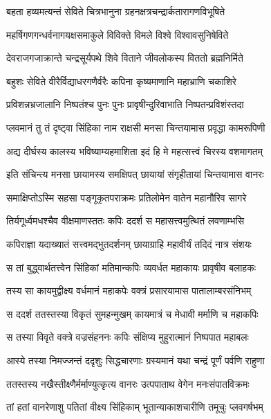 \twolineshloka
{बहता हव्यमत्यन्तं सेविते चित्रभानुना}
{ग्रहनक्षत्रचन्द्रार्कतारागणविभूषिते} %

\twolineshloka
{महर्षिगणगन्धर्वनागयक्षसमाकुले}
{विविक्ते विमले विश्वे विश्वावसुनिषेविते} %

\twolineshloka
{देवराजगजाक्रान्ते चन्द्रसूर्यपथे शिवे}
{विताने जीवलोकस्य विततो ब्रह्मनिर्मिते} %

\twolineshloka
{बहुशः सेविते वीरैर्विद्याधरगणैर्वरैः}
{कपिना कृष्यमाणानि महाभ्राणि चकाशिरे} %

\twolineshloka
{प्रविशन्नभ्रजालानि निष्पतंश्च पुनः पुनः}
{प्रावृषीन्दुरिवाभाति निष्पतन्प्रविशंस्तदा} %

\twolineshloka
{प्लवमानं तु तं दृष्ट्वा सिंहिका नाम राक्षसी}
{मनसा चिन्तयामास प्रवृद्धा कामरूपिणी} %

\twolineshloka
{अद्य दीर्घस्य कालस्य भविष्याम्यहमाशिता}
{इदं हि मे महत्सत्त्वं चिरस्य वशमागतम्} %

\twolineshloka
{इति संचिन्त्य मनसा छायामस्य समक्षिपत्}
{छायायां संगृहीतायां चिन्तयामास वानरः} %

\twolineshloka
{समाक्षिप्तोऽस्मि सहसा पङ्गूकृतपराक्रमः}
{प्रतिलोमेन वातेन महानौरिव सागरे} %

\twolineshloka
{तिर्यगूर्ध्वमधश्चैव वीक्षमाणस्ततः कपिः}
{ददर्श स महासत्त्वमुत्थितं लवणाम्भसि} %

\twolineshloka
{कपिराज्ञा यदाख्यातं सत्त्वमद्भुतदर्शनम्}
{छायाग्राहि महावीर्यं तदिदं नात्र संशयः} %

\twolineshloka
{स तां बुद्ध्वार्थतत्त्वेन सिंहिकां मतिमान्कपिः}
{व्यवर्धत महाकायः प्रावृषीव बलाहकः} %

\twolineshloka
{तस्य सा कायमुद्वीक्ष्य वर्धमानं महाकपेः}
{वक्त्रं प्रसारयामास पातालाम्बरसंनिभम्} %

\twolineshloka
{स ददर्श ततस्तस्या विकृतं सुमहन्मुखम्}
{कायमात्रं च मेधावी मर्माणि च महाकपिः} %

\twolineshloka
{स तस्या विवृते वक्त्रे वज्रसंहननः कपिः}
{संक्षिप्य मुहुरात्मानं निष्पपात महाबलः} %

\twolineshloka
{आस्ये तस्या निमज्जन्तं ददृशुः सिद्धचारणाः}
{ग्रस्यमानं यथा चन्द्रं पूर्णं पर्वणि राहुणा} %

\twolineshloka
{ततस्तस्य नखैस्तीक्ष्णैर्मर्माण्युत्कृत्य वानरः}
{उत्पपाताथ वेगेन मनःसंपातविक्रमः} %

\twolineshloka
{तां हतां वानरेणाशु पतितां वीक्ष्य सिंहिकाम्}
{भूतान्याकाशचारीणि तमूचुः प्लवगर्षभम्} %


